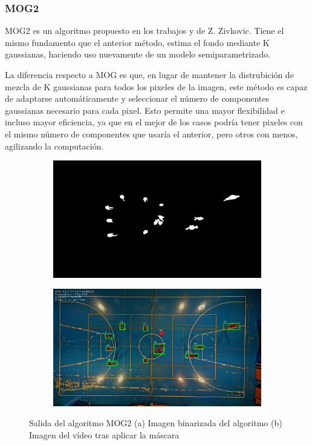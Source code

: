 \subsubsection*{MOG2}
MOG2 es un algoritmo propuesto en los trabajos \cite{art:Zivkovic1} y \cite{art:Zivkovic2} de Z. Zivkovic. Tiene el mismo fundamento que el anterior método, estima el fondo mediante K gaussianas, haciendo uso nuevamente de un modelo semiparametrizado. 

La diferencia respecto a MOG es que, en lugar de mantener la distrubición de mezcla de K gaussianas para todos los pixeles de la imagen, este método es capaz de adaptarse automáticamente y seleccionar el número de componentes gaussianas necesario para cada pixel. Esto permite una mayor flexibilidad e incluso mayor eficiencia, ya que en el mejor de los casos podría tener pixeles con el mismo número de componentes que usaría el anterior, pero otros con menos, agilizando la computación.

\begin{figure}
\begin{subfigure}{.5\textwidth}
  \centering
  \includegraphics[width=.9\linewidth]{images/MOG2Sub}
  \caption { }
  \label{fig:MOG21a}
\end{subfigure}%
\begin{subfigure}{.5\textwidth}
  \centering
  \includegraphics[width=.9\linewidth]{images/MOG2}
  \caption { }
  \label{fig:MOG21b}
\end{subfigure}
\caption{Salida del algoritmo MOG2 (a) Imagen binarizada del algoritmo (b) Imagen del vídeo tras aplicar la máscara }
\label{fig:MOG2}
\end{figure}

